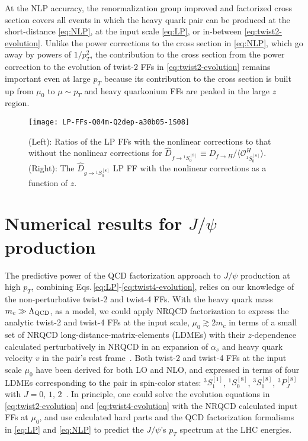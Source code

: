 \documentclass[Physsubmission, Phys]{SciPost}
\begin{document}
At the NLP accuracy, the renormalization group improved and factorized cross section covers all events in which the heavy quark pair can be produced at the short-distance \eqref{eq:NLP}, at the input scale \eqref{eq:LP}, or in-between \eqref{eq:twist2-evolution}.  Unlike the power corrections to the cross section in \eqref{eq:NLP}, which go away by powers of $1/p_T^2$, the contribution to the cross section from the power correction to the evolution of twist-2 FFs in \eqref{eq:twist2-evolution} remains important even at large $p_T$ because its contribution to the cross section is built up from $\mu_0$ to $\mu \sim p_T$ and heavy quarkonium FFs are peaked in the large $z$ region.  


\begin{figure}[t]
\centering
\texttt{[image: LP-FFs-Q04m-Q2dep-a30b05-1S08]}
\caption{(Left): Ratios of the LP FFs with the nonlinear corrections to that without the nonlinear corrections for $\hat{D}_{f\to {^1S_0^{[8]}}}\equiv D_{f\to H}/\langle \mathcal{O}_{^1S_0^{[8]}}^{H}\rangle$. 
(Right): The $\hat{D}_{g\to {^1S_0^{[8]}}}$
LP FF with the nonlinear corrections as a function of $z$. }
\label{fig:LP-FFs}
\end{figure}

\section{Numerical results for $J/\psi$ production}
\label{sec:method}

The predictive power of the QCD factorization approach to $J/\psi$ production at high $p_T$, combining Eqs.\,\eqref{eq:LP}-\eqref{eq:twist4-evolution}, relies on our knowledge of the non-perturbative twist-2 and twist-4 FFs.  With the heavy quark mass 
$m_c\gg \Lambda_{\rm QCD}$, as a model, we could apply NRQCD factorization to express the analytic twist-2 and twist-4 FFs at the input scale, $\mu_0\gtrsim 2m_c$ in terms of a small set of NRQCD long-distance-matrix-elements (LDMEs) with their $z$-dependence calculated perturbatively in NRQCD in an expansion of $\alpha_s$ and heavy quark velocity $v$ in the pair's rest frame~\cite{Nayak:2005rt,Kang:2014tta,Kang:2014pya}.  Both twist-2 and twist-4 FFs at the input scale $\mu_0$ have been derived for both LO and NLO, and expressed in terms of four LDMEs corresponding to the pair in spin-color states: ${^3S_1^{[1]}}$, ${^1S_0^{[8]}}$, ${^3S_1^{[8]}}$, ${^3P_J^{[8]}}$ with $J=0,\,1,\,2$~\cite{Ma:2013yla,Ma:2014eja}.  
In principle, one could solve the evolution equations in \eqref{eq:twist2-evolution} and \eqref{eq:twist4-evolution} with the NRQCD calculated input FFs at $\mu_0$, and use calculated hard parts and the QCD factorization formalisms in \eqref{eq:LP} and \eqref{eq:NLP} to predict the $J/\psi$'s $p_T$ spectrum at the LHC energies.
\end{document}
